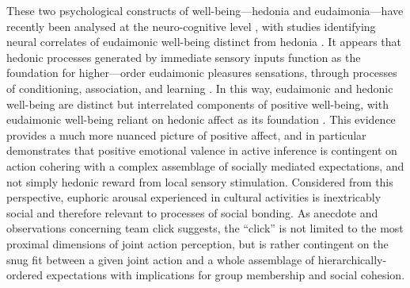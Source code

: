 These two psychological constructs of well-being---hedonia and eudaimonia---have recently been analysed at the neuro-cognitive level \citep{Berridge2011}, with studies identifying neural correlates of eudaimonic well-being distinct from hedonia \citep{Lewis2014}. It appears that hedonic processes generated by immediate sensory inputs function as the foundation for higher—order eudaimonic pleasures sensations, through processes of conditioning, association, and learning \citep{Berridge2003}.  In this way, eudaimonic and hedonic well-being are distinct but interrelated components of positive well-being, with eudaimonic well-being reliant on hedonic affect as its foundation \citep{Berridge2011}. This evidence provides a much more nuanced picture of positive affect, and in particular demonstrates that positive emotional valence in active inference is contingent on action cohering with a complex assemblage of socially mediated expectations, and not simply hedonic reward from local sensory stimulation.  Considered from this perspective, euphoric arousal experienced in cultural activities is inextricably social and therefore relevant to processes of social bonding.
As anecdote and observations concerning team click suggests, the ``click'' is not limited to the most proximal dimensions of joint action perception, but is rather contingent on the snug fit between a given joint action and a whole assemblage of hierarchically-ordered expectations with implications for group membership and social cohesion.

